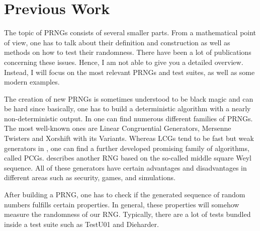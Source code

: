 \documentclass{stdlocal}
\begin{document}
  \section{Previous Work} %
  \label{sec:previous_work}
    The topic of PRNGs consists of several smaller parts.
    From a mathematical point of view, one has to talk about their definition and construction as well as methods on how to test their randomness.
    There have been a lot of publications concerning these issues.
    Hence, I am not able to give you a detailed overview.
    Instead, I will focus on the most relevant PRNGs and test suites, as well as some modern examples.

    The creation of new PRNGs is sometimes understood to be black magic and can be hard since basically, one has to build a deterministic algorithm with a nearly non-deterministic output.
    In \cite{kneusel2018} one can find numerous different families of PRNGs.
    The most well-known ones are Linear Congruential Generators, Mersenne Twisters and Xorshift with its Variants.
    Whereas LCGs tend to be fast but weak generators in \cite{oneill2014}, one can find a further developed promising family of algorithms, called PCGs.
    \cite{widynski2019} describes another RNG based on the so-called middle square Weyl sequence.
    All of these generators have certain advantages and disadvantages in different areas such as security, games, and simulations.

    After building a PRNG, one has to check if the generated sequence of random numbers fulfills certain properties.
    In general, these properties will somehow measure the randomness of our RNG.
    Typically, there are a lot of tests bundled inside a test suite such as TestU01 and Dieharder.
\end{document}
